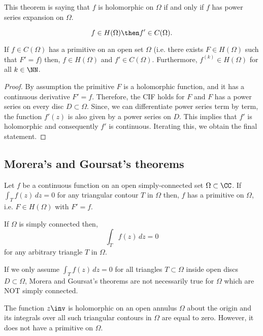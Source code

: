 \documentclass[12pt, a4paper]{article}
\begin{document}
\begin{mdnote}
    This theorem is saying that \(f\) is holomorphic on \(\Omega\) if and only if \(f\) has power series expansion on \(\Omega\).
\end{mdnote}

\begin{theorem}
    \[f\in H(\Omega) \then f'\in C(\Omega).\]
\end{theorem}

\begin{mdlemma}
    If \(f \in C(\Omega)\) has a primitive on an open set \(\Omega\) (i.e. there exists \(F \in H(\Omega)\) such that \(F'=f\)) then, \(f \in H(\Omega)\) and \(f'\in C(\Omega)\). Furthermore, \(f^{(k)} \in H(\Omega)\) for all \(k \in \NN\).
\end{mdlemma}

\begin{proof}
    By assumption the primitive \(F\) is a holomorphic function, and it has a continuous derivative \(F'=f\). Therefore, the CIF holds for \(F\) and \(F\) has a power series on every disc \(D \subset \Omega\). Since, we can differentiate power series term by term, the function \(f'(z)\) is also given by a power series on \(D\). This implies that \(f'\) is holomorphic and consequently \(f'\) is continuous. Iterating this, we obtain the final statement.
\end{proof}

\subsection{Morera's and Goursat's theorems}

\begin{mdthm}
    Let \(f\) be a continuous function on an open simply-connected set \(\Omega \subset \CC\). If \\ \(\int_T f(z) \, dz =0\) for any triangular contour \(T\) in \(\Omega\) then, \(f\) has a primitive on \(\Omega\), i.e. \(F \in H(\Omega)\) with \(F'=f\).
\end{mdthm}

\begin{theorem}
    If \(\Omega\) is simply connected then, 
    \[\int_T f(z) \, dz =0\]
    for any arbitrary triangle \(T\) in \(\Omega\).
\end{theorem}

\begin{mdremark}
    If we only assume \(\int_T f(z) \, dz =0\) for all triangles \(T \subset \Omega\) inside open discs \(D \subset \Omega\), Morera and Goursat's theorems are not necessarily true for \(\Omega\) which are NOT simply connected. 
    \begin{example}
        The function \(z\inv\) is holomorphic on an open annulus \(\Omega\) about the origin and its integrals over all such triangular contours in \(\Omega\) are equal to zero. However, it does not have a primitive on \(\Omega\).
    \end{example}
\end{mdremark}
\end{document}
